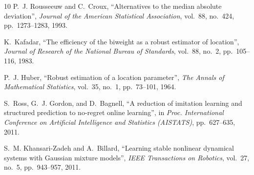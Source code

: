 \documentclass[a4paper, 10pt, conference]{ieeeconf}
\begin{document}
\begin{thebibliography}{10}
    P.~J. Rousseeuw and C.~Croux,
    ``Alternatives to the median absolute deviation'',
    \emph{Journal of the American Statistical Association}, vol.~88, no.~424,
    pp.~1273--1283, 1993.

    K.~Kafadar,
    ``The efficiency of the biweight as a robust estimator of location'',
    \emph{Journal of Research of the National Bureau of Standards}, vol.~88, no.~2,
    pp.~105--116, 1983.

    P.~J. Huber,
    ``Robust estimation of a location parameter'',
    \emph{The Annals of Mathematical Statistics}, vol.~35, no.~1, pp.~73--101, 1964.

    S.~Ross, G.~J. Gordon, and D.~Bagnell,
    ``A reduction of imitation learning and structured prediction to no-regret online learning'',
    in \emph{Proc. International Conference on Artificial Intelligence and Statistics (AISTATS)},
    pp.~627--635, 2011.

    S.~M. Khansari-Zadeh and A.~Billard,
    ``Learning stable nonlinear dynamical systems with Gaussian mixture models'',
    \emph{IEEE Transactions on Robotics},
    vol.~27, no.~5, pp.~943--957, 2011.

\end{thebibliography}
\end{document}

